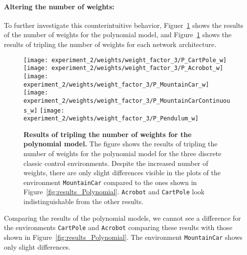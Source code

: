 \paragraph*{Altering the number of weights:} To further investigate this counterintuitive behavior, Figuer~\ref{fig:results_NN_weights} shows the results of the number of weights for the polynomial model, and Figure~\ref{fig:results_NN_weights} shows the results of tripling the number of weights for each network architecture.
\begin{figure}[!ht]
  \centering
\texttt{[image: experiment\_2/weights/weight\_factor\_3/P\_CartPole\_w]}
\texttt{[image: experiment\_2/weights/weight\_factor\_3/P\_Acrobot\_w]}
\texttt{[image: experiment\_2/weights/weight\_factor\_3/P\_MountainCar\_w]}
\texttt{[image: experiment\_2/weights/weight\_factor\_3/P\_MountainCarContinuous\_w]}
\texttt{[image: experiment\_2/weights/weight\_factor\_3/P\_Pendulum\_w]}
\caption[Results of tripling the number of weights for the poylnomial model]{
  \textbf{Results of tripling the number of weights for the polynomial model.}
   The figure shows the results of tripling the number of weights for the polynomial model for the three discrete classic control environments. Despite the increased number of weights, there are only slight differences visible in the plots of the environment \texttt{MountainCar} compared to the ones shown in Figure~\ref{fig:results_Polynomial}. \texttt{Acrobot} and \texttt{CartPole} look indistinguishable from the other results.
}
\label{fig:results_NN_weights}
\end{figure}
Comparing the results of the polynomial models, we cannot see a difference for the environments \verb|CartPole| and \verb|Acrobot| comparing these results with those shown in Figure~\ref{fig:results_Polynomial}. The environment \verb|MountainCar| shows only slight differences.

